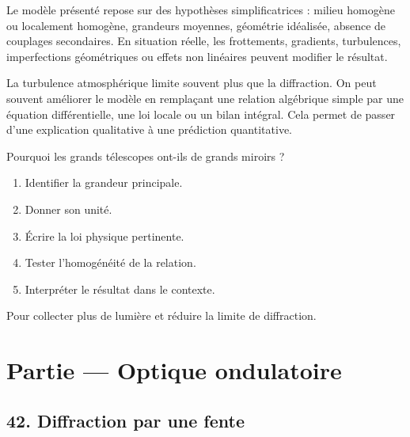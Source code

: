 \documentclass[11pt,a4paper]{article}
\begin{document}
\begin{attentionbox}
Le modèle présenté repose sur des hypothèses simplificatrices : milieu homogène ou localement homogène, grandeurs moyennes, géométrie idéalisée, absence de couplages secondaires. En situation réelle, les frottements, gradients, turbulences, imperfections géométriques ou effets non linéaires peuvent modifier le résultat.
\end{attentionbox}

\begin{approfondissementbox}
La turbulence atmosphérique limite souvent plus que la diffraction.
On peut souvent améliorer le modèle en remplaçant une relation algébrique simple par une équation différentielle, une loi locale ou un bilan intégral. Cela permet de passer d'une explication qualitative à une prédiction quantitative.
\end{approfondissementbox}

\begin{exercicebox}
Pourquoi les grands télescopes ont-ils de grands miroirs ?
\begin{enumerate}
  \item Identifier la grandeur principale.
  \item Donner son unité.
  \item Écrire la loi physique pertinente.
  \item Tester l'homogénéité de la relation.
  \item Interpréter le résultat dans le contexte.
\end{enumerate}
\end{exercicebox}

\begin{corrigebox}[Indication]
Pour collecter plus de lumière et réduire la limite de diffraction.
\end{corrigebox}


\section{Partie — Optique ondulatoire}


\subsection{42. Diffraction par une fente}
\end{document}
